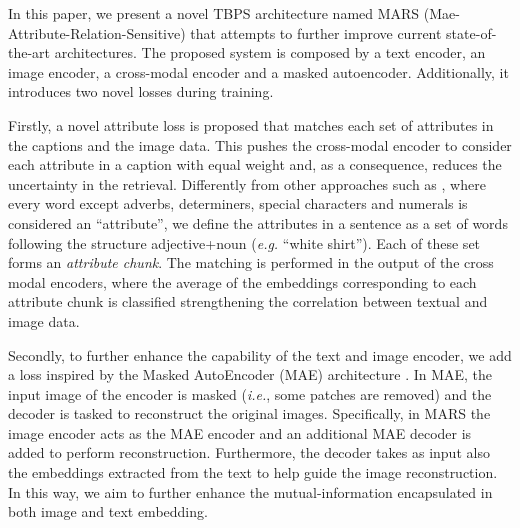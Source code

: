 \documentclass[acmsmall]{acmart}
\begin{document}
In this paper, we present a novel TBPS architecture named MARS (Mae-Attribute-Relation-Sensitive) that attempts to further improve current state-of-the-art architectures. The proposed system is composed by a text encoder, an image encoder, a cross-modal encoder and a masked autoencoder. Additionally, it introduces two novel losses during training.

Firstly, a novel attribute loss is proposed that matches each set of attributes in the captions and the image data. This pushes the cross-modal encoder to consider each attribute in a caption with equal weight and, as a consequence, reduces the uncertainty in the retrieval. Differently from other approaches such as \cite{niu2024comprehensive}, where every word except adverbs, determiners, special characters and numerals is considered an ``attribute'', we define the attributes in a sentence as a set of words following the structure adjective+noun (\textit{e.g.} ``white shirt''). Each of these set forms an \textit{attribute chunk}. The matching is performed in the output of the cross modal encoders, where the average of the embeddings corresponding to each attribute chunk is classified strengthening the correlation between textual and image data.

Secondly, to further enhance the capability of the text and image encoder, we add a loss inspired by the Masked AutoEncoder (MAE) architecture \cite{he2022masked}. In MAE, the input image of the encoder is masked (\textit{i.e.}, some patches are removed) and the decoder is tasked to reconstruct the original images. Specifically, in MARS the image encoder acts as the MAE encoder and an additional MAE decoder is added to perform reconstruction. Furthermore, the decoder takes as input also the embeddings extracted from the text to help guide the image reconstruction. In this way, we aim to further enhance the mutual-information encapsulated in both image and text embedding.
\end{document}
